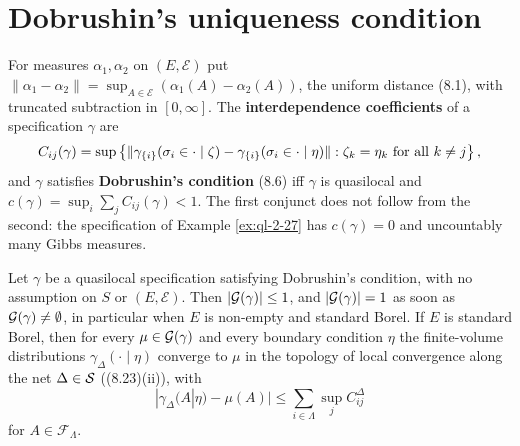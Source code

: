 \section{Dobrushin's uniqueness condition}

\begin{definition}
    \label{def:dob-interdep}
    \leanok

    For measures $\alpha_1, \alpha_2$ on $(E,\mathcal{E})$ put
    $\lVert\alpha_1 - \alpha_2\rVert = \sup_{A \in \mathcal{E}}(\alpha_1(A) - \alpha_2(A))$, the
    uniform distance (8.1), with truncated subtraction in $[0,\infty]$. The
    \textbf{interdependence coefficients} of a specification $\gamma$ are
    \[C_{ij}(\gamma) = \sup\left\{ \lVert\gamma_{\{i\}}(\sigma_i \in \cdot \mid \zeta)
        - \gamma_{\{i\}}(\sigma_i \in \cdot \mid \eta)\rVert :
        \zeta_k = \eta_k \text{ for all } k \neq j \right\},\]
    and $\gamma$ satisfies \textbf{Dobrushin's condition} (8.6) iff $\gamma$ is quasilocal and
    $c(\gamma) = \sup_i \sum_{j} C_{ij}(\gamma) < 1$. The first conjunct does not follow from the
    second: the specification of Example \ref{ex:ql-2-27} has $c(\gamma) = 0$ and uncountably
    many Gibbs measures.
\end{definition}

\begin{theorem}
    \label{thm:dob-uniqueness}
    \leanok

    Let $\gamma$ be a quasilocal specification satisfying Dobrushin's condition, with no
    assumption on $S$ or $(E,\mathcal{E})$. Then $|\mathcal{G}(\gamma)| \leq 1$, and
    $|\mathcal{G}(\gamma)| = 1$ as soon as $\mathcal{G}(\gamma) \neq \emptyset$, in particular when $E$ is
    non-empty and standard Borel. If $E$ is standard Borel, then for every
    $\mu \in \mathcal{G}(\gamma)$ and every boundary condition $\eta$ the finite-volume distributions
    $\gamma_{\Delta}(\cdot \mid \eta)$ converge to $\mu$ in the topology of local convergence
    along the net $\Delta \in \mathcal{S}$ ((8.23)(ii)), with
    \[|\gamma_{\Delta}(A|\eta) - \mu(A)| \leq \sum_{i \in \Lambda} \sup_j C^{\Delta}_{ij}\]
    for $A \in \mathcal{F}_\Lambda$.
\end{theorem}

